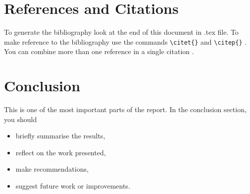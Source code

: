 \documentclass{UoNMCHA}
\numberwithin{equation}{section}
\begin{document}
\section{References and Citations}\label{sec:RefCite}
To generate the bibliography look at the end of this document in .tex file. To make reference to the bibliography use the commands \verb|\citet{}| and \verb|\citep{}| \citep{strunk2007elements}. You can combine more than one reference in a single citation \citep{troyka1999simon, jay1995write}.



\section{Conclusion}\label{sec:Conclusion}
This is one of the most important parts of the report. In the conclusion section, you  should 
\begin{itemize}
\item briefly summarise the results,
\item reflect on the work presented, 
\item make recommendations,
\item suggest future work or improvements.
\end{itemize}



\appendix
\newpage
\end{document}
